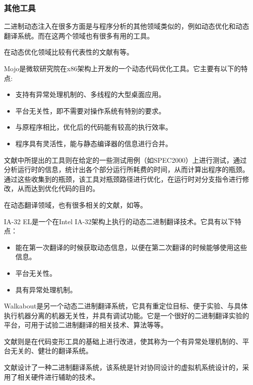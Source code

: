 \subsubsection{其他工具}

二进制动态注入在很多方面是与程序分析的其他领域类似的，例如动态优化和动态翻译系统。而在这两个领域也有很多有用的工具。

在动态优化领域比较有代表性的文献有\cite{mojo, continuous}等。

Mojo\cite{mojo}是微软研究院在x86架构上开发的一个动态代码优化工具。它主要有以下的特点:

\begin{itemize}
	\item 支持有异常处理机制的、多线程的大型桌面应用。
	\item 平台无关性，即不需要对操作系统有特别的要求。
	\item 与原程序相比，优化后的代码能有较高的执行效率。
	\item 程序具有灵活性，能与静态编译器的信息进行合并。
\end{itemize}

文献\cite{continuous}中所提出的工具则在给定的一些测试用例（如SPEC2000）上进行测试，通过分析运行时的信息，统计出各个部分运行所耗费的时间，从而计算出程序的瓶颈。通过这些收集到的瓶颈，该工具对瓶颈路径进行优化，在运行时对分支指令进行修改，从而达到优化代码的目的。

在动态翻译领域，也有很多相关的文献，如\cite{bt1, bt2, bt3, bt4}等。

IA-32 EL\cite{ia32}是一个在Intel IA-32架构上执行的动态二进制翻译技术。它具有以下特点：

\begin{itemize}
	\item 能在第一次翻译的时候获取动态信息，以便在第二次翻译的时候能够使用这些信息。
	\item 平台无关性。
	\item 具有异常处理机制。
\end{itemize}

Walkabout\cite{walkabout}是另一个动态二进制翻译系统，它具有重定位目标、便于实验、与具体执行机器分离的机器无关性，并具有调试功能。它是一个很好的二进制翻译实验的平台，可用于试验二进制翻译的相关技术、算法等等。

文献\cite{transmeta}则是在代码变形工具的基础上进行改进，使其称为一个有异常处理机制的、平台无关的、健壮的翻译系统。

文献\cite{accu}设计了一种二进制翻译系统，该系统是针对协同设计的虚拟机系统设计的，采用了相关硬件进行辅助的技术。


